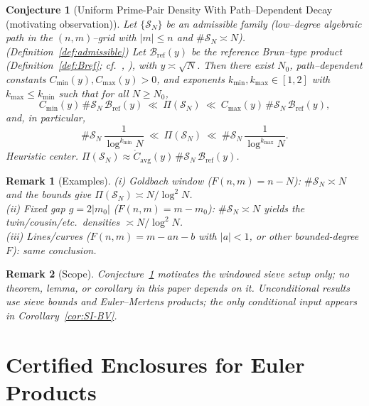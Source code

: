 \documentclass[11pt]{article}
\theoremstyle{inline}
\newtheorem*{remark}{Remark}
\theoremstyle{break}
\theoremstyle{break}
\theoremstyle{break}
\theoremstyle{break}
\theoremstyle{break}
\newtheorem{conjecture}{Conjecture}
\theoremstyle{break}
\theoremstyle{break}
\theoremstyle{inline}
\newcommand{\tavg}{{\scriptscriptstyle\mathrm{avg}}}
\newcommand{\tref}{{\scriptscriptstyle\mathrm{ref}}}
\newcommand{\Cpred}{\mathring{C}}   %
\newcommand{\Bref}{\mathcal{B}_\tref}
\begin{document}
\begin{conjecture}[Uniform Prime-Pair Density With Path–Dependent Decay (motivating observation)]\label{conj:uniform-C}
Let \( \{\mathcal{S}_N\} \) be an admissible family (low–degree algebraic path in the \( (n,m) \)–grid with \( |m|\le n \) and \( \#\mathcal{S}_N\asymp N \)).  (Definition~\ref{def:admissible})
Let \( \Bref(y) \) be the reference Brun–type product
(Definition~\ref{def:Bref}; cf.~\cite[§1.6]{HalberstamRichert1974}, \cite[Ch.~4]{Riesel1994}),
with \( y\asymp\sqrt{N} \).
Then there exist \( N_0 \), path–dependent constants \( C_{\min}(y),C_{\max}(y)>0 \), and exponents
\( k_{\min},k_{\max}\in[1,2] \) with \( k_{\max} \le k_{\min} \) such that for all \( N\ge N_0 \),
\begin{equation}
C_{\min}(y)\,\#\mathcal{S}_N\,\Bref(y)
\ \ll\
\Pi(\mathcal{S}_N)
\ \ll\
C_{\max}(y)\,\#\mathcal{S}_N\,\Bref(y),
\end{equation}
and, in particular,
\begin{equation}
\#\mathcal{S}_N\,\frac{1}{\log^{k_{\min}} N}
\ \ll\
\Pi(\mathcal{S}_N)
\ \ll\
\#\mathcal{S}_N\,\frac{1}{\log^{k_{\max}} N}.
\end{equation}
\emph{Heuristic center.}\quad
\( \Pi(\mathcal{S}_N)\approx \Cpred_\tavg(y)\,\#\mathcal{S}_N\,\Bref(y) \).
\end{conjecture}

\begin{remark}[Examples]
(i) \emph{Goldbach window} (\( F(n,m)=n-N \)): \( \#\mathcal{S}_N\asymp N \) and the bounds give \( \Pi(\mathcal{S}_N)\asymp N/\log^2 N \).\\
(ii) \emph{Fixed gap} \( g=2|m_0| \) (\( F(n,m)=m-m_0 \)): \( \#\mathcal{S}_N\asymp N \) yields the twin/cousin/etc.\ densities \( \asymp N/\log^2 N \).\\
(iii) \emph{Lines/curves} (\( F(n,m)=m-an-b \) with \( |a|<1 \), or other bounded-degree \( F \)): same conclusion.
\end{remark}

\begin{remark}[Scope]
Conjecture~\ref{conj:uniform-C} motivates the windowed sieve setup only; no theorem, lemma, or corollary in this paper depends on it. Unconditional results use sieve bounds and Euler–Mertens products; the only conditional input appears in Corollary~\ref{cor:SI-BV}.
\end{remark}


\section{Certified Enclosures for Euler Products}\label{app:enclosures}
\end{document}
